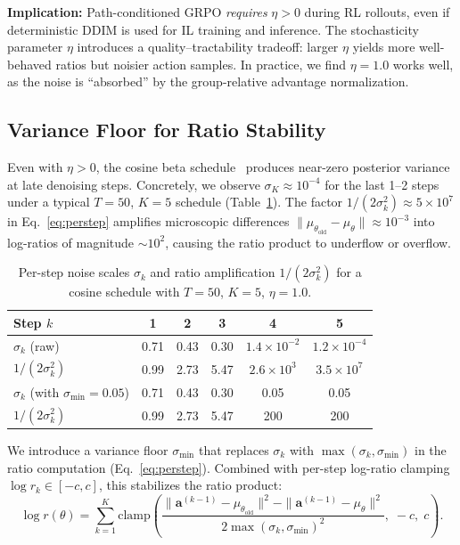 \documentclass{article}
\newcommand{\ba}{\mathbf{a}}
\begin{document}
\noindent\textbf{Implication:} Path-conditioned GRPO \emph{requires} $\eta > 0$ during RL rollouts, even if deterministic DDIM is used for IL training and inference.
The stochasticity parameter $\eta$ introduces a quality--tractability tradeoff: larger $\eta$ yields more well-behaved ratios but noisier action samples.
In practice, we find $\eta = 1.0$ works well, as the noise is ``absorbed'' by the group-relative advantage normalization.

\subsection{Variance Floor for Ratio Stability}
\label{sec:sigmafloor}

Even with $\eta > 0$, the cosine beta schedule~\cite{nichol2021improved} produces near-zero posterior variance at late denoising steps.
Concretely, we observe $\sigma_K \approx 10^{-4}$ for the last 1--2 steps under a typical $T=50$, $K=5$ schedule (Table~\ref{tab:sigma}).
The factor $1/(2\sigma_k^2) \approx 5 \times 10^7$ in Eq.~\ref{eq:perstep} amplifies microscopic differences $\|\mu_{\theta_\text{old}} - \mu_\theta\| \approx 10^{-3}$ into log-ratios of magnitude $\sim 10^2$, causing the ratio product to underflow or overflow.

\begin{table}[t]
\centering
\caption{Per-step noise scales $\sigma_k$ and ratio amplification $1/(2\sigma_k^2)$ for a cosine schedule with $T=50$, $K=5$, $\eta=1.0$.}
\label{tab:sigma}
\begin{tabular}{lccccc}
\toprule
Step $k$ & 1 & 2 & 3 & 4 & 5 \\
\midrule
$\sigma_k$ (raw) & 0.71 & 0.43 & 0.30 & $1.4 \times 10^{-2}$ & $1.2 \times 10^{-4}$ \\
$1/(2\sigma_k^2)$ & 0.99 & 2.73 & 5.47 & $2.6 \times 10^3$ & $3.5 \times 10^7$ \\
\midrule
$\sigma_k$ (with $\sigma_{\min}=0.05$) & 0.71 & 0.43 & 0.30 & 0.05 & 0.05 \\
$1/(2\sigma_k^2)$ & 0.99 & 2.73 & 5.47 & 200 & 200 \\
\bottomrule
\end{tabular}
\end{table}

We introduce a variance floor $\sigma_{\min}$ that replaces $\sigma_k$ with $\max(\sigma_k, \sigma_{\min})$ in the ratio computation (Eq.~\ref{eq:perstep}).
Combined with per-step log-ratio clamping $\log r_k \in [-c, c]$, this stabilizes the ratio product:
\begin{equation}
\label{eq:stable_ratio}
\log r(\theta) = \sum_{k=1}^{K} \text{clamp}\!\left(\frac{\|\ba^{(k-1)} - \mu_{\theta_\text{old}}\|^2 - \|\ba^{(k-1)} - \mu_\theta\|^2}{2\max(\sigma_k, \sigma_{\min})^2},\; -c,\; c\right).
\end{equation}
\end{document}
